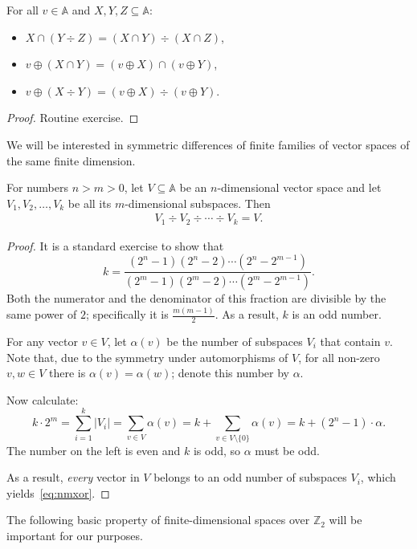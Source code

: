 \documentclass{theoretics}
\newcommand{\Z}{{\mathbb Z}}
\newcommand{\xor}{\div}
\newcommand{\atoms}{\mathbb A}
\begin{document}
\begin{lemma}\label{fact:vec-basic}
For all $v\in\atoms$ and $X,Y,Z\subseteq\atoms$:
\begin{itemize}
\item[(i)] $X\cap(Y\xor Z) = (X\cap Y)\xor (X\cap Z)$,\label{eq:cap-diff}
\item[(ii)] $v\oplus(X\cap Y) = (v\oplus X)\cap (v\oplus Y)$,\label{eq:oplus-cap}
\item[(iii)] $v\oplus(X\xor Y) = (v\oplus X)\xor(v\oplus Y)$.\label{eq:oplus-diff}
\end{itemize}
\end{lemma}
\begin{proof}Routine exercise.
\end{proof}

We will be interested in symmetric differences of finite families of vector spaces of the same finite dimension.

\begin{lemma}\label{lem:nmxor}
For numbers $n>m>0$, let $V\subseteq\atoms$ be an $n$-dimensional vector space and let 
$V_1,V_2,\ldots,V_k$ be all its $m$-dimensional subspaces. Then
\begin{align}\label{eq:nmxor}
	V_1\xor V_2\xor\cdots\xor V_k = V.
\end{align}
\end{lemma}
\begin{proof}
It is a standard exercise to show that
\[
	k = \dfrac{(2^n-1)(2^n-2)\cdots(2^n-2^{m-1})}{(2^m-1)(2^m-2)\cdots(2^m-2^{m-1})}.
\]
Both the numerator and the denominator of this fraction are divisible by the same power of $2$; specifically it is $\frac{m(m-1)}{2}$. As a result, $k$ is an odd number. 

For any vector $v\in V$, let $\alpha(v)$ be the number of subspaces $V_i$ that contain $v$. Note that, due to the symmetry under automorphisms of $V$, for all non-zero $v,w\in V$ there is $\alpha(v)=\alpha(w)$; denote this number by $\alpha$.

Now calculate:
\[
	k\cdot2^m = \sum_{i=1}^k|V_i| = \sum_{v\in V}\alpha(v) = k+\sum_{v\in V\setminus\{0\}}\alpha(v) = k+(2^n-1)\cdot\alpha.
\] 
The number on the left is even and $k$ is odd, so $\alpha$ must be odd.

As a result, {\em every} vector in $V$ belongs to an odd number of subspaces $V_i$, which yields~\eqref{eq:nmxor}.
\end{proof}

The following basic property of finite-dimensional spaces over $\Z_2$ will be important for our purposes.
\end{document}
